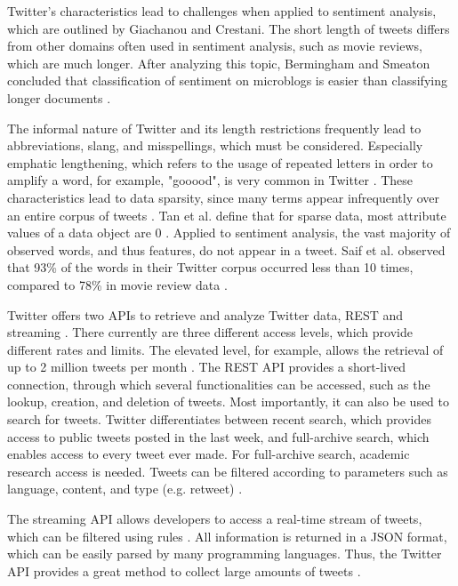 Twitter's characteristics lead to challenges when applied to sentiment analysis, which are outlined by Giachanou and Crestani. The short length of tweets differs from other domains often used in sentiment analysis, such as movie reviews, which are much longer. After analyzing this topic, Bermingham and Smeaton concluded that classification of sentiment on microblogs is easier than classifying longer documents \cite{microblogs}.

The informal nature of Twitter and its length restrictions frequently lead to abbreviations, slang, and misspellings, which must be considered. Especially emphatic lengthening, which refers to the usage of repeated letters in order to amplify a word, for example, "gooood", is very common in Twitter \cite{DBLP:journals/csur/GiachanouC16}. These characteristics lead to data sparsity, since many terms appear infrequently over an entire corpus of tweets \cite{DBLP:journals/csur/GiachanouC16}. Tan et al. define that for sparse data, most attribute values of a data object are 0 \cite{DBLP:books/aw/TanSKK2019}. Applied to sentiment analysis, the vast majority of observed words, and thus features, do not appear in a tweet. Saif et al. observed that 93\% of the words in their Twitter corpus occurred less than 10 times, compared to 78\% in movie review data \cite{data_sparsity}. 

Twitter offers two APIs to retrieve and analyze Twitter data, REST and streaming \cite{DBLP:journals/csur/GiachanouC16}. There currently are three different access levels, which provide different rates and limits. The elevated level, for example, allows the retrieval of up to 2 million tweets per month \cite{twitter:about}. The REST API provides a short-lived connection, through which several functionalities can be accessed, such as the lookup, creation, and deletion of tweets. Most importantly, it can also be used to search for tweets. Twitter differentiates between recent search, which provides access to public tweets posted in the last week, and full-archive search, which enables access to every tweet ever made. For full-archive search, academic research access is needed. Tweets can be filtered according to parameters such as language, content, and type (e.g. retweet) \cite{twitter:search}. 

The streaming API allows developers to access a real-time stream of tweets, which can be filtered using rules \cite{twitter:stream}. All information is returned in a JSON format, which can be easily parsed by many programming languages. Thus, the Twitter API provides a great method to collect large amounts of tweets \cite{DBLP:journals/csur/GiachanouC16}.




